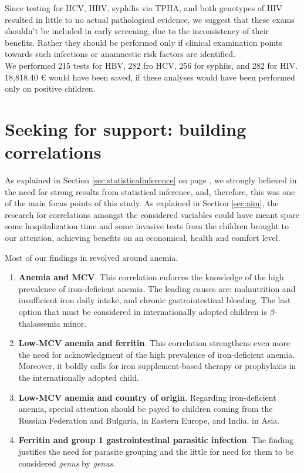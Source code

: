Since testing for HCV, HBV, syphilis via TPHA, and both genotypes of HIV resulted in little to no actual pathological evidence, we suggest that these exams shouldn't be included in early screening, due to the inconsistency of their benefits. Rather they should be performed only if clinical examination points towards such infections or anamnestic risk factors are identified.\\
We performed 215 tests for HBV, 282 fro HCV, 256 for syphiis, and 282 for HIV. 18,818.40 € would have been saved, if these analyses would have been performed only on positive children.

\section{Seeking for support: building correlations}\label{sec:seekingforsupport}
As explained in Section \ref{sec:statisticalinference} on page \pageref{sec:statisticalinference}, we strongly believed in the need for strong results from statistical inference, and, therefore, this was one of the main focus points of this study. As explained in Section \ref{sec:aim}, the research for correlations amongst the considered variables could have meant spare some hospitalization time and some invasive tests from the children brought to our attention, achieving benefits on an economical, health and comfort level.

Most of our findings in revolved around anemia.

\begin{enumerate}
	\item \textbf{Anemia and MCV}. This correlation enforces the knowledge of the high prevalence of iron-deficient anemia. The leading causes are: malnutrition and insufficient iron daily intake, and chronic gastrointestinal bleeding. The last option that must be considered in internationally adopted children is $\beta$-thalassemia minor.
	\item \textbf{Low-MCV anemia and ferritin}. This correlation strengthens even more the need for acknowledgment of the high prevalence of iron-deficient anemia. Moreover, it boldly calls for iron supplement-based therapy or prophylaxis in the internationally adopted child.
	\item \textbf{Low-MCV anemia and country of origin}. Regarding iron-deficient anemia, special attention should be payed to children coming from the Russian Federation and Bulgaria, in Eastern Europe, and India, in Asia.
	\item \textbf{Ferritin and group 1 gastrointestinal parasitic infection}. The finding justifies the need for parasite grouping and the little for need for them to be considered \textit{genus} by \textit{genus}.
\end{enumerate}

